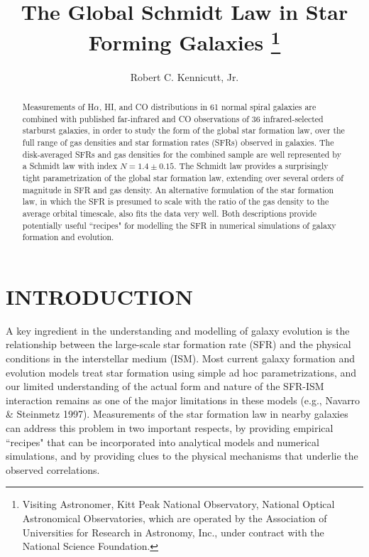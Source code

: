 \def\hii{H\thinspace II}
\def\h2{H$_2$}
\def\halpha{H$\alpha$}
\def\microns{$\mu$m}
\def\brgamma{Br$\gamma$}
\def\msun{M$_\odot$}
\def\lsun{L$_\odot$}
\def\etal{et al.\ }
\def\sfr{$sfr$}

\onecolumn
\title{The Global Schmidt Law in Star Forming Galaxies
\footnote{Visiting Astronomer, Kitt Peak National Observatory, National
Optical Astronomical Observatories, which are operated by the Association
of Universities for Research in Astronomy, Inc., under contract with
the National Science Foundation.}
}

\author{Robert C. Kennicutt, Jr.}


\begin{abstract}

Measurements of \halpha, HI, and CO distributions in 61 normal spiral 
galaxies are combined with published far-infrared and CO observations
of 36 infrared-selected starburst galaxies, in order to study the form of the
global star formation law, over the full range of gas densities and
star formation rates (SFRs) observed in galaxies.  The disk-averaged SFRs 
and gas densities for the combined sample are well represented by a Schmidt
law with index $N = 1.4 \pm 0.15$.  The Schmidt law provides
a surprisingly tight parametrization of the global star formation law,
extending over several orders of magnitude in SFR and gas density.  
An alternative formulation of the
star formation law, in which the SFR is presumed to scale 
with the ratio of the gas density to the average orbital timescale, also
fits the data very well.  Both descriptions provide
potentially useful ``recipes" for modelling the SFR in numerical simulations of
galaxy formation and evolution.

\end{abstract}


\section{INTRODUCTION}

A key ingredient in the understanding and modelling of galaxy evolution
is the relationship between the large-scale star formation rate (SFR)  
and the physical conditions in the interstellar medium (ISM).  Most current 
galaxy formation and evolution models treat star formation using simple  
ad hoc parametrizations, and our 
limited understanding of the actual form and nature of the 
SFR-ISM interaction remains as one of the 
major limitations in these models (e.g., Navarro \& Steinmetz 1997).
Measurements of the star formation law in nearby 
galaxies can address this problem in two important respects, by providing 
empirical ``recipes" that can be incorporated into analytical models and 
numerical simulations, and by providing clues to the physical mechanisms that 
underlie the observed correlations. 

